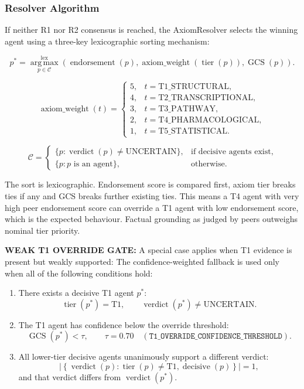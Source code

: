 \documentclass{article}
\begin{document}
\subsubsection{Resolver Algorithm}
If neither R1 nor R2 consensus is reached, the AxiomResolver selects the winning agent using a three-key lexicographic sorting mechanism:

\[
p^{*}
=
\operatorname*{arg\,max}^{\mathrm{lex}}_{p\in\mathcal{C}}
\left(
\operatorname{endorsement}(p),
\operatorname{axiom\_weight}(\operatorname{tier}(p)),
\operatorname{GCS}(p)
\right).
\]

\[
\operatorname{axiom\_weight}(t)
=
\begin{cases}
5, & t=\mathrm{T1\_STRUCTURAL},\\
4, & t=\mathrm{T2\_TRANSCRIPTIONAL},\\
3, & t=\mathrm{T3\_PATHWAY},\\
2, & t=\mathrm{T4\_PHARMACOLOGICAL},\\
1, & t=\mathrm{T5\_STATISTICAL}.
\end{cases}
\]

\[
\mathcal{C}
=
\begin{cases}
\{p : \operatorname{verdict}(p)\neq\mathrm{UNCERTAIN}\},
& \text{if decisive agents exist},\\
\{p : p\text{ is an agent}\},
& \text{otherwise}.
\end{cases}
\]

The sort is lexicographic. Endorsement score is compared first, axiom tier breaks ties if any and GCS breaks further existing ties. This means a T4 agent with very high peer endorsement score can override a T1 agent with low endorsement score, which is the expected behaviour. Factual grounding as judged by peers outweighs nominal tier priority.

\noindent\textbf{WEAK T1 OVERRIDE GATE:}
A special case applies when T1 evidence is present but weakly supported:
\noindent
The confidence-weighted fallback is used only when all of the following
conditions hold:

\begin{enumerate}[label=(\arabic*), leftmargin=*]
    \item There exists a decisive T1 agent $p^{*}$:
    \[
    \operatorname{tier}(p^{*})=\mathrm{T1},
    \qquad
    \operatorname{verdict}(p^{*})\neq\mathrm{UNCERTAIN}.
    \]

    \item The T1 agent has confidence below the override threshold:
    \[
    \operatorname{GCS}(p^{*})<\tau,
    \qquad
    \tau=0.70
    \quad
    (\texttt{T1\_OVERRIDE\_CONFIDENCE\_THRESHOLD}).
    \]

    \item All lower-tier decisive agents unanimously support a different verdict:
    \[
    \left|
    \left\{
    \operatorname{verdict}(p):
    \operatorname{tier}(p)\neq\mathrm{T1},
    \operatorname{decisive}(p)
    \right\}
    \right|=1,
    \]
    and that verdict differs from $\operatorname{verdict}(p^{*})$.
\end{enumerate}
\end{document}
